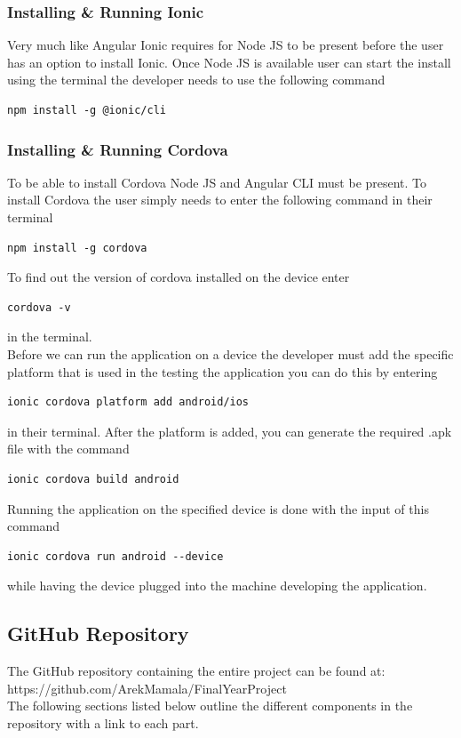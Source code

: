 \documentclass[a4paper,12pt]{report}
\begin{document}
\subsubsection{Installing \& Running Ionic }
Very much like Angular Ionic requires for Node JS to be present before the user has an option to install Ionic.
Once Node JS is available user can start the install using the terminal the developer needs to use the following command 
\begin{verbatim}
npm install -g @ionic/cli    
\end{verbatim}


\subsubsection{Installing \& Running Cordova }
To be able to install Cordova Node JS and Angular CLI must be present. To install Cordova the user simply needs to enter the following command in their terminal
\begin{verbatim}
npm install -g cordova
\end{verbatim}
To find out the version of cordova installed on the device enter 
\begin{verbatim}
cordova -v
\end{verbatim}
in the terminal.\cite{cordova}\\
\newpage
Before we can run the application on a device the developer must add the specific platform that is used in the testing the application you can do this by entering
\begin{verbatim}
ionic cordova platform add android/ios
\end{verbatim}
in their terminal.
After the platform is added, you can generate the required .apk file with the command 
\begin{verbatim}
ionic cordova build android
\end{verbatim}

Running the application on the specified device is done with the input of this command 
\begin{verbatim}
ionic cordova run android --device   
\end{verbatim} while having the device plugged into the machine developing the application. \cite{cordovaRun}


\subsection{GitHub Repository}
The GitHub repository containing the entire project can be found at:\\ 
https://github.com/ArekMamala/FinalYearProject\\
The following sections listed below outline the different components in the repository with a link to each part.
\end{document}
